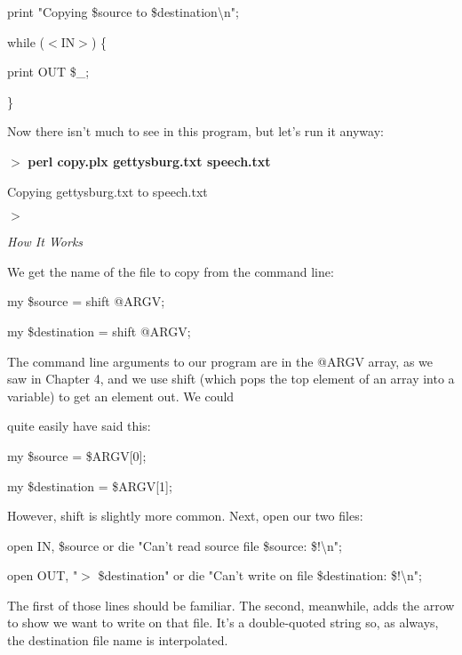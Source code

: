 \documentclass[a4paper,11pt]{book}
\begin{document}
\noindent 

\noindent print "Copying \$source to \$destination\textbackslash n";

\noindent 

\noindent while ($<$IN$>$) \{

\noindent print OUT \$\_;

\noindent \}

\noindent 

\noindent Now there isn't much to see in this program, but let's run it anyway:

\noindent 

\noindent $>$ \textbf{perl copy.plx gettysburg.txt speech.txt}

\noindent Copying gettysburg.txt to speech.txt

\noindent $>$

\noindent 

\noindent \textit{How It Works}

\noindent We get the name of the file to copy from the command line:

\noindent 

\noindent my \$source = shift @ARGV;

\noindent my \$destination = shift @ARGV;

\noindent 

\noindent The command line arguments to our program are in the @ARGV array, as we saw in Chapter 4, and we use shift (which pops the top element of an array into a variable) to get an element out. We could

\noindent quite easily have said this:

\noindent 

\noindent my \$source = \$ARGV[0];

\noindent my \$destination = \$ARGV[1];

\noindent 

\noindent However, shift is slightly more common. Next, open our two files:

\noindent 

\noindent open IN, \$source or die "Can't read source file \$source: \$!\textbackslash n";

\noindent open OUT, "$>$ \$destination" or die "Can't write on file \$destination: \$!\textbackslash n";

\noindent 

\noindent The first of those lines should be familiar. The second, meanwhile, adds the arrow to show we want to write on that file. It's a double-quoted string so, as always, the destination file name is interpolated.
\end{document}
